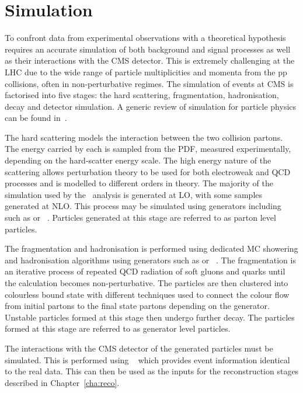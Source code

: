 \section{Simulation}

To confront data from experimental observations with a theoretical hypothesis requires an accurate
simulation of both background and signal processes as well as their interactions with the CMS detector.
This is extremely challenging at the LHC due to the wide range of particle multiplicities and momenta 
from the pp collisions, often in non-perturbative regimes. The simulation of events at CMS 
is factorised into five stages: the hard scattering, fragmentation, hadronisation, decay and 
detector simulation. A generic review of simulation for particle physics can be found in~\cite{sim_rev}.

The hard scattering models the interaction between the two collision partons. The energy carried by each
is sampled from the PDF, measured experimentally, depending on the hard-scatter energy scale. 
The high energy nature of the scattering allows perturbation theory to be used for both electroweak and QCD processes
and is modelled to different orders in theory. The majority of the simulation used by the \alphat~analysis is generated at LO, with some 
samples generated at NLO. This process may be simulated using generators including such as \PYTHIA or \MADGRAPH~\cite{PYTHIA,MADGRAPH}. Particles
generated at this stage are referred to as parton level particles.

The fragmentation and hadronisation is performed using dedicated MC showering and hadronisation algorithms using
generators such as \PYTHIA or \HERWIG~\cite{PYTHIA,HERWIG}. The fragmentation is an iterative process of repeated QCD 
radiation of soft gluons and quarks until the calculation
becomes non-perturbative. The particles are then clustered into colourless bound state with different techniques used
to connect the colour flow from initial partons to the final state partons depending on the generator. Unstable particles
formed at this stage then undergo further decay. The particles formed at this stage are referred to as generator level 
particles.

The interactions with the CMS detector of the generated particles must be simulated. This is performed using \GEANTfour~\cite{GEANT} which provides
event information identical to the real data. This can then be used as the inputs for the reconstruction stages described 
in Chapter~\ref{cha:reco}.

